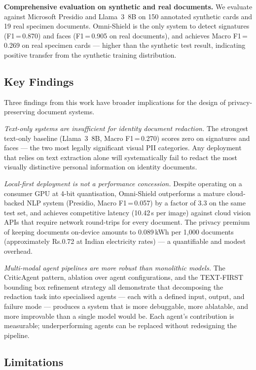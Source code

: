\documentclass[conference]{IEEEtran}
\makeatletter
\newcommand{\rupee}{\textrm{Rs.\@}}
\makeatother
\begin{document}
\textbf{Comprehensive evaluation on synthetic and
real documents.}
We evaluate against Microsoft Presidio and Llama~3~8B
on 150 annotated synthetic cards and 19 real specimen
documents.
Omni-Shield is the only system to detect signatures
(F1\,=\,0.870) and faces (F1\,=\,0.905 on real
documents), and achieves Macro F1\,=\,0.269 on real
specimen cards --- higher than the synthetic test
result, indicating positive transfer from the
synthetic training distribution.

\subsection*{Key Findings}

Three findings from this work have broader implications
for the design of privacy-preserving document systems.

\emph{Text-only systems are insufficient for identity
document redaction.}
The strongest text-only baseline (Llama~3~8B,
Macro F1\,=\,0.270) scores zero on signatures and
faces --- the two most legally significant visual PII
categories.
Any deployment that relies on text extraction alone
will systematically fail to redact the most visually
distinctive personal information on identity documents.

\emph{Local-first deployment is not a performance
concession.}
Despite operating on a consumer GPU at 4-bit
quantisation, Omni-Shield outperforms a mature
cloud-backed NLP system (Presidio, Macro F1\,=\,0.057)
by a factor of 3.3 on the same test set, and
achieves competitive latency (10.42\,s per image)
against cloud vision APIs that require network
round-trips for every document.
The privacy premium of keeping documents on-device
amounts to 0.089\,kWh per 1,000 documents
(approximately \rupee0.72 at Indian electricity
rates) --- a quantifiable and modest overhead.

\emph{Multi-modal agent pipelines are more robust
than monolithic models.}
The CriticAgent pattern, ablation over agent
configurations, and the TEXT-FIRST bounding box
refinement strategy all demonstrate that decomposing
the redaction task into specialised agents --- each
with a defined input, output, and failure mode ---
produces a system that is more debuggable,
more ablatable, and more improvable than a
single model would be.
Each agent's contribution is measurable; underperforming
agents can be replaced without redesigning the pipeline.

\subsection*{Limitations}
\end{document}
